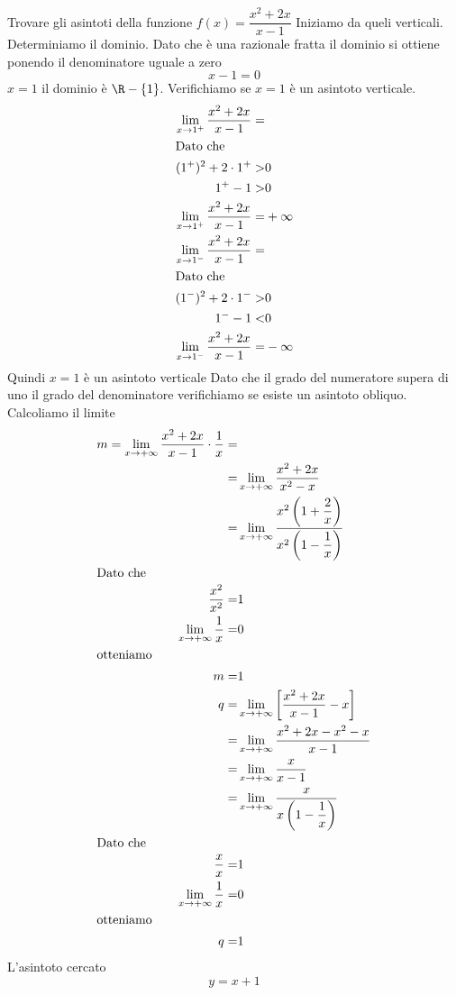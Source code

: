 \begin{exercise}
	Trovare gli asintoti della funzione $f(x)=\dfrac{x^2+2x}{x-1}$
	\tcblower
Iniziamo da queli verticali. Determiniamo il dominio. Dato che è una razionale fratta il dominio si ottiene ponendo il denominatore uguale a zero\[x-1=0\] $x=1$ il dominio è $\R-\lbrace1\rbrace$. Verifichiamo se $x=1$ è un asintoto verticale.
\begin{align*}
\lim_{x\to 1^+}\dfrac{x^2+2x}{x-1}=&\\
\intertext{Dato che}
(1^+)^2+2\cdot 1^+>&0\\
1^+-1>&0\\
\lim_{x\to 1^+}\dfrac{x^2+2x}{x-1}=&+\infty\\
\lim_{x\to 1^-}\dfrac{x^2+2x}{x-1}=&\\
\intertext{Dato che}
(1^-)^2+2\cdot 1^->&0\\
1^--1<&0\\
\lim_{x\to 1^-}\dfrac{x^2+2x}{x-1}=&-\infty\\
\end{align*}
Quindi $x=1$ è un asintoto verticale
Dato che il grado del numeratore supera di uno il grado del denominatore verifichiamo se esiste un asintoto obliquo. Calcoliamo il limite
\begin{align*}
m=\lim_{x\to +\infty}\dfrac{x^2+2x}{x-1}\cdot\dfrac{1}{x}=&\\
=&\lim_{x\to +\infty}\dfrac{x^2+2x}{x^2-x}\\
=&\lim_{x\to +\infty}\dfrac{x^2\left(1+\dfrac{2}{x}\right)}{x^2\left(1-\dfrac{1}{x}\right)}\\
\intertext{Dato che}
\dfrac{x^2}{x^2}=&1\\
\lim_{x\to +\infty}\dfrac{1}{x}=&0\\
\intertext{otteniamo}
m=&1\\
q=&\lim_{x\to +\infty}\left[\dfrac{x^2+2x}{x-1}-x\right]\\
=&\lim_{x\to +\infty}\dfrac{x^2+2x-x^2-x}{x-1}\\
=&\lim_{x\to +\infty}\dfrac{x}{x-1}\\
=&\lim_{x\to +\infty}\dfrac{x}{x\left(1-\dfrac{1}{x}\right)}\\
\intertext{Dato che}
\dfrac{x}{x}=&1\\
\lim_{x\to +\infty}\dfrac{1}{x}=&0\\
\intertext{otteniamo}
q=&1\\
\end{align*}
L'asintoto cercato\[y=x+1\]
\end{exercise}
